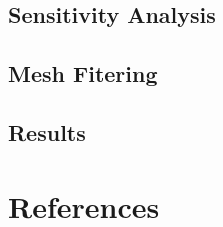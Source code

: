 \documentclass[10pt]{article}
\begin{document}
\subsection{Sensitivity Analysis}

\subsection{Mesh Fitering}

\subsection{Results}
\cite{first}
\cite{WEBSITE:1}

\newpage
\section{References}


\end{document}
